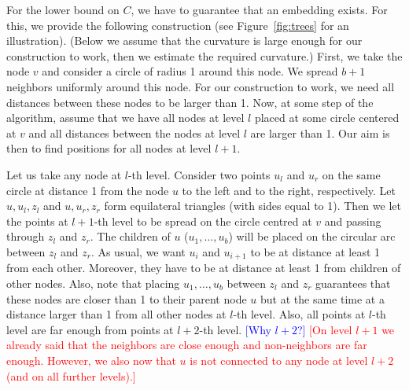 \documentclass{article} %
\newcommand{\ph}[1]{\textcolor{blue}{#1}}
\newcommand{\lt}[1]{\textcolor{red}{#1}}
\begin{document}
For the lower bound on $C$, we have to guarantee that an embedding exists. For this, we provide the following construction (see Figure~\ref{fig:trees} for an illustration).
(Below we assume that the curvature is large enough for our construction to work, then we estimate the required curvature.)
First, we take the node $v$ and consider a circle of radius 1 around this node. 
We spread $b + 1$ neighbors uniformly around this node. For our construction to work, we need all distances between these nodes to be larger than 1.
Now, at some step of the algorithm, assume that we have all nodes at level $l$ placed at some circle centered at $v$ and all distances between the nodes at level $l$ are larger than 1. Our aim is then to find positions for all nodes at level $l + 1$.

Let us take any node at $l$-th level. Consider two points $u_l$ and $u_r$ on the same circle at distance 1 from the node $u$ to the left and to the right, respectively.
Let $u,u_l,z_l$ and $u,u_r,z_r$ form equilateral triangles (with sides equal to 1). Then we let the points at $l+1$-th level to be spread on the circle centred at $v$ and passing through $z_l$ and $z_r$. The children of $u$ ($u_1, \ldots, u_{b}$) will be placed on the circular arc between $z_l$ and $z_r$. As usual, we want $u_i$ and $u_{i+1}$ to be at distance at least 1 from each other. Moreover, they have to be at distance at least 1 from children of other nodes. Also, note that placing $u_1, \ldots, u_{b}$ between $z_l$ and $z_r$ guarantees that these nodes are closer than 1 to their parent node $u$ but at the same time at a distance larger than 1 from all other nodes at $l$-th level. Also, all points at $l$-th level are far enough from points at $l+2$-th level. \ph{[Why $l+2$?]} \lt{[On level $l+1$ we already said that the neighbors are close enough and non-neighbors are far enough. However, we also now that $u$ is not connected to any node at level $l+2$ (and on all further levels).]}
\end{document}

